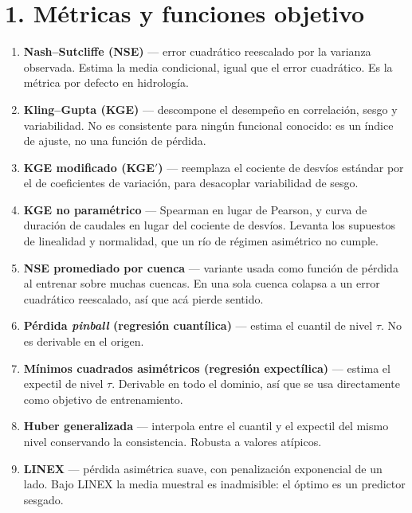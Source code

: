 \documentclass{../comun/tesisuba}
\newcommand{\entrada}[2]{\item \textbf{#1} --- #2}
\begin{document}
\newpage

\section*{1. Métricas y funciones objetivo}

\begin{enumerate}[leftmargin=*, itemsep=3pt]

\entrada{Nash--Sutcliffe (NSE)}{error cuadrático reescalado por la varianza observada. Estima la
media condicional, igual que el error cuadrático. Es la métrica por defecto en hidrología.
\citet{nash-sutcliffe-1970}}

\entrada{Kling--Gupta (KGE)}{descompone el desempeño en correlación, sesgo y variabilidad. No es
consistente para ningún funcional conocido: es un índice de ajuste, no una función de pérdida.
\citet{gupta-2009-kge}}

\entrada{KGE modificado (KGE$'$)}{reemplaza el cociente de desvíos estándar por el de coeficientes
de variación, para desacoplar variabilidad de sesgo. \citet{kling-2012-modified-kge}}

\entrada{KGE no paramétrico}{Spearman en lugar de Pearson, y curva de duración de caudales en
lugar del cociente de desvíos. Levanta los supuestos de linealidad y normalidad, que un río de
régimen asimétrico no cumple. \citet{pool-2018-nonparametric-kge}}

\entrada{NSE promediado por cuenca}{variante usada como función de pérdida al entrenar sobre
muchas cuencas. En una sola cuenca colapsa a un error cuadrático reescalado, así que acá pierde
sentido. \citet{kratzert-2019-universal-regional-local}}

\entrada{Pérdida \textit{pinball} (regresión cuantílica)}{estima el cuantil de nivel $\tau$. No es
derivable en el origen. \citet{koenker-bassett-1978}}

\entrada{Mínimos cuadrados asimétricos (regresión expectílica)}{estima el expectil de nivel
$\tau$. Derivable en todo el dominio, así que se usa directamente como objetivo de entrenamiento.
\citet{newey-powell-1987}}

\entrada{Huber generalizada}{interpola entre el cuantil y el expectil del mismo nivel conservando
la consistencia. Robusta a valores atípicos. \citet{taggart-2022-generalized-huber-loss}}

\entrada{LINEX}{pérdida asimétrica suave, con penalización exponencial de un lado. Bajo LINEX la
media muestral es inadmisible: el óptimo es un predictor sesgado.
\citet{zellner-1986-asymmetric-loss-linex}}


\end{enumerate}
\end{document}
